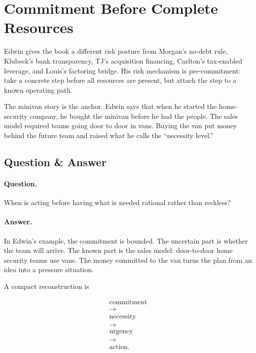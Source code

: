 \documentclass[11pt,oneside]{book}
\begin{document}
\section{Commitment Before Complete Resources}

Edwin gives the book a different risk posture from Morgan's no-debt rule, Klubeck's bank transparency, TJ's acquisition financing, Carlton's tax-enabled leverage, and Louis's factoring bridge. His risk mechanism is pre-commitment: take a concrete step before all resources are present, but attach the step to a known operating path.

The minivan story is the anchor. Edwin says that when he started the home-security company, he bought the minivan before he had the people. The sales model required teams going door to door in vans. Buying the van put money behind the future team and raised what he calls the ``necessity level.''

\subsection{Question \& Answer}

\paragraph{Question.}
When is acting before having what is needed rational rather than reckless?

\paragraph{Answer.}
In Edwin's example, the commitment is bounded. The uncertain part is whether the team will arrive. The known part is the sales model: door-to-door home security teams use vans. The money committed to the van turns the plan from an idea into a pressure situation.

A compact reconstruction is

\begin{equation}
\begin{gathered}
\mathrm{commitment}\\
\rightarrow\\
\mathrm{necessity}\\
\rightarrow\\
\mathrm{urgency}\\
\rightarrow\\
\mathrm{action}.
\end{gathered}
\end{equation}
\end{document}
